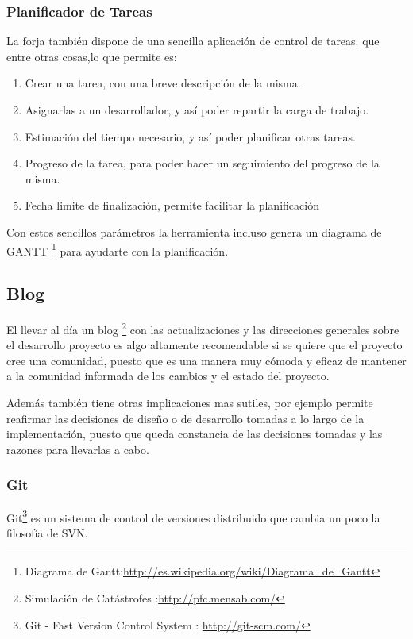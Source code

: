 \subsubsection*{Planificador de Tareas}
La forja también dispone de una sencilla aplicación de control de tareas.
que entre otras cosas,lo que permite es:
\begin{enumerate}
 \item Crear una tarea, con una breve descripción de la misma.
 \item Asignarlas a un desarrollador, y así poder repartir la carga de trabajo.
 \item Estimación del tiempo necesario, y así poder planificar otras tareas.
 \item Progreso de la tarea, para poder hacer un seguimiento del progreso de la
misma.
 \item Fecha limite de finalización, permite facilitar la planificación
\end{enumerate}
Con estos sencillos parámetros la herramienta incluso genera un diagrama de
GANTT
\footnote{Diagrama de
Gantt:\url{http://es.wikipedia.org/wiki/Diagrama_de_Gantt}} para ayudarte con
la planificación.

\subsection*{Blog}
El llevar al día un blog \footnote{Simulación de Catástrofes
:\url{http://pfc.mensab.com/}} con las actualizaciones y las direcciones
generales sobre el desarrollo proyecto es algo altamente recomendable si se
quiere que el proyecto cree una comunidad, puesto que es una manera muy cómoda y
eficaz de mantener a la comunidad informada de los cambios y el estado del
proyecto.

Además también tiene otras implicaciones mas sutiles, por ejemplo permite
reafirmar las decisiones de diseño o de desarrollo tomadas a lo largo de la
implementación, puesto que queda constancia de las decisiones tomadas y las
razones para llevarlas a cabo.
\subsubsection*{Git}
Git\footnote{Git - Fast Version Control System : \url{http://git-scm.com/}} es
un sistema de control de versiones distribuido que cambia un poco la filosofía
de SVN.

